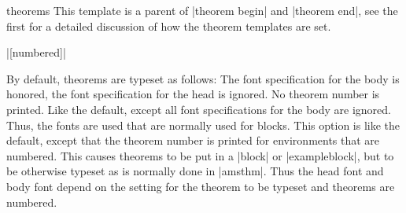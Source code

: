 \begin{element}{theorems}\semiyes\no\no
  This template is a parent of |theorem begin| and |theorem end|, see the first for a detailed discussion of how the theorem templates are set.

  \example
  |[numbered]|

  \begin{templateoptions}
    By default, theorems are typeset as follows: The font specification for the body is honored, the font specification for the head is ignored. No theorem number is printed.
    Like the default, except all font specifications for the body are ignored. Thus, the fonts are used that are normally used for blocks.
    This option is like the default, except that the theorem number is printed for environments that are numbered.
    This causes theorems to be put in a |block| or |exampleblock|, but to be otherwise typeset as is normally done in |amsthm|. Thus the head font and body font depend on the setting for the theorem to be typeset and theorems are numbered.
  \end{templateoptions}
\end{element}


